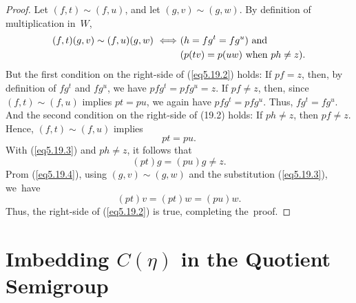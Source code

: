 \documentclass{surv-l}
\numberwithin{equation}{section}
\numberwithin{table}{section}
\numberwithin{figure}{section}
\theoremstyle{plain}
\theoremstyle{definition}
\begin{document}
\begin{proof}Let $(f,t)\sim(f, u)$, and let $(g, v)\sim(g, w)$. By
definition of multiplication in~$W$,
\begin{align}\label{eq5.19.2}
(f, t)(g, v)\sim(f, u)(g, w)\ \Longleftrightarrow\ &(h=fg^{t}=fg^{u})\ \mathrm{and}\notag\\
&(p(tv)=p(uw)\ \mathrm{when}\ ph\neq z).
\end{align}
But the first condition on the right-side of (\ref{eq5.19.2})
holds: If $pf=z$, then, by definition of $fg^{t}$ and $fg^{u}$, we
have $pfg^{t}=pfg^{u}=z$. If $pf\neq z$, then, since $(f,t)\sim(f,
u)$ implies $pt=pu$, we again have $pfg^{t}=pfg^{u}$. Thus,
$fg^{t}=fg^{u}$. And the second condition on the right-side of
(19.2) holds: If $ph\neq z$, then $pf\neq z$. Hence,
$(f,t)\sim(f,u)$ implies
\begin{equation}\label{eq5.19.3}
 pt=pu.
\end{equation}
With (\ref{eq5.19.3}) and $ph\neq z$, it follows that
\begin{equation}\label{eq5.19.4}
 (pt)g=(pu)g\neq z.
\end{equation}
Prom (\ref{eq5.19.4}), using $(g, v)\sim(g, w)$ and the
substitution (\ref{eq5.19.3}), we~have
\[
(pt)v=(pt)w=(pu)w.
\]
Thus, the right-side of (\ref{eq5.19.2}) is true, completing
the~proof.
\end{proof}

\section[Imbedding $C(\eta)$ into the Quotient Semigroup]{Imbedding $C(\eta)$ in the Quotient Semigroup}\label{sec5.20}
\end{document}
